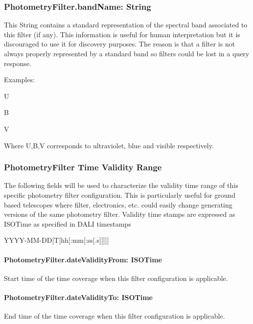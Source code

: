 \documentclass[11pt,a4paper]{ivoa}
\begin{document}
\subsubsection{PhotometryFilter.bandName: String}
This String contains a standard representation of the spectral band 
associated to this filter (if any). This information is useful for human 
interpretation but it is discouraged to use it for discovery purposes. The 
reason is that a filter is not always properly represented by a standard 
band so filters could be lost in a query response.
\par

Examples:
\par


U \par B  \par V
\bigskip


Where U,B,V corresponds to ultraviolet, blue and visible respectively.
\par

\subsubsection{PhotometryFilter Time Validity Range}
The following fields will be used to characterize the validity time range of 
this specific photometry filter configuration. This is particularly useful 
for ground based telescopes where filter, electronics, etc. could easily 
change generating versions of the same photometry filter.
Validity time stamps are expressed as ISOTime as specified in DALI \citep{2017ivoa.spec.0517D} 
timestamps\par 
YYYY-MM-DD[T[hh[:mm[:ss[.s]]]]]
\bigskip

\paragraph{PhotometryFilter.dateValidityFrom: ISOTime}
Start time of the time coverage when this filter configuration is 
applicable. 

\paragraph{PhotometryFilter.dateValidityTo: ISOTime}
End time of the time coverage when this filter configuration is 
applicable.
\end{document}
